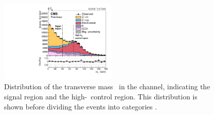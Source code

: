 \begin{figure}[h!]
\begin{center}
\includegraphics[width=0.5\textwidth]{./MSSM/Figures/CMS-PAS-HIG-16-037_Figure_002.pdf}
\end{center}
\caption[Distribution of the transverse mass \mT~in the \mutau channel, indicating the signal region and the high-\mT~control region.]{Distribution of the transverse mass \mT~in the \mutau channel, indicating
the signal region and the high-\mT~control region. This distribution is shown
before dividing the events into categories \cite{CMS-PAS-HIG-16-037}.}
\label{fig:mssm_bkgs_wjets_mutau_mt}
\end{figure}

